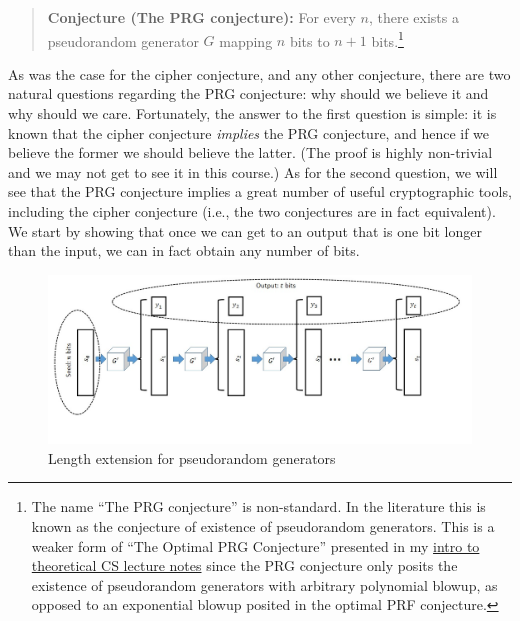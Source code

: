 \begin{quote}
\textbf{Conjecture (The PRG conjecture):} For every \(n\), there exists
a pseudorandom generator \(G\) mapping \(n\) bits to \(n+1\)
bits.\footnote{The name ``The PRG conjecture'' is non-standard. In the
  literature this is known as the conjecture of existence of
  pseudorandom generators. This is a weaker form of ``The Optimal PRG
  Conjecture'' presented in my \href{https://goo.gl/G7bU4M}{intro to
  theoretical CS lecture notes} since the PRG conjecture only posits the
  existence of pseudorandom generators with arbitrary polynomial blowup,
  as opposed to an exponential blowup posited in the optimal PRF
  conjecture.}
\end{quote}

As was the case for the cipher conjecture, and any other conjecture,
there are two natural questions regarding the PRG conjecture: why should
we believe it and why should we care. Fortunately, the answer to the
first question is simple: it is known that the cipher conjecture
\emph{implies} the PRG conjecture, and hence if we believe the former we
should believe the latter. (The proof is highly non-trivial and we may
not get to see it in this course.) As for the second question, we will
see that the PRG conjecture implies a great number of useful
cryptographic tools, including the cipher conjecture (i.e., the two
conjectures are in fact equivalent). We start by showing that once we
can get to an output that is one bit longer than the input, we can in
fact obtain any number of bits.

\hypertarget{lengthextendprgthm}{}


\begin{figure}
\centering
\includegraphics[width=\textwidth, height=0.25\paperheight, keepaspectratio]{../figure/length-extension-prg.jpg}
\caption{Length extension for pseudorandom generators}
\label{lengthextendprgfig}
\end{figure}

